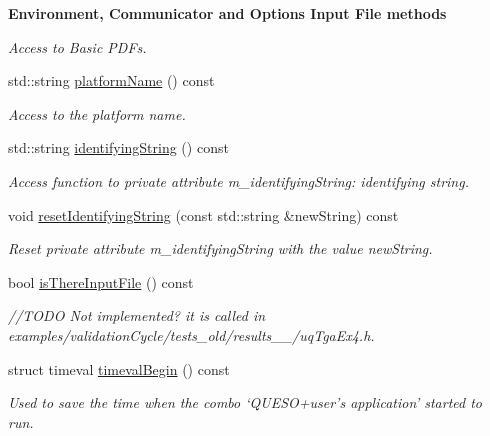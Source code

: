 \begin{Indent}{\bf Environment, Communicator and Options Input File methods}
\begin{DoxyCompactItemize}
\begin{DoxyCompactList}\small\item\em Access to Basic P\-D\-Fs. \end{DoxyCompactList}\item 
std\-::string \hyperlink{class_q_u_e_s_o_1_1_base_environment_a2ce73b968a255fd32b91e9aab9d06a8a}{platform\-Name} () const 
\begin{DoxyCompactList}\small\item\em Access to the platform name. \end{DoxyCompactList}\item 
std\-::string \hyperlink{class_q_u_e_s_o_1_1_base_environment_a52e4108f22c92968be4ff4af0dfc4eac}{identifying\-String} () const 
\begin{DoxyCompactList}\small\item\em Access function to private attribute m\-\_\-identifying\-String\-: identifying string. \end{DoxyCompactList}\item 
void \hyperlink{class_q_u_e_s_o_1_1_base_environment_a26f4d920bb377248fe7d6d9c1841f0a9}{reset\-Identifying\-String} (const std\-::string \&new\-String) const 
\begin{DoxyCompactList}\small\item\em Reset private attribute m\-\_\-identifying\-String with the value {\ttfamily new\-String}. \end{DoxyCompactList}\item 
bool \hyperlink{class_q_u_e_s_o_1_1_base_environment_a56aa5626cb7aae203d72c57679ba0683}{is\-There\-Input\-File} () const 
\begin{DoxyCompactList}\small\item\em //\-T\-O\-D\-O Not implemented? it is called in examples/validation\-Cycle/tests\-\_\-old/results\-\_\-\_/uq\-Tga\-Ex4.\-h. \end{DoxyCompactList}\item 
struct timeval \hyperlink{class_q_u_e_s_o_1_1_base_environment_a1adcf7ca2d95e75a29360bcfe091cd65}{timeval\-Begin} () const 
\begin{DoxyCompactList}\small\item\em Used to save the time when the combo `\-Q\-U\-E\-S\-O+user's application' started to run. \end{DoxyCompactList}\end{DoxyCompactItemize}
\end{Indent}
